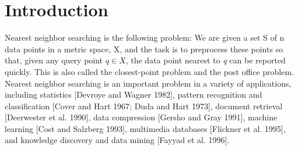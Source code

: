 \documentclass[ijoc,nonblindrev]{informs3} %
\begin{document}
%

\section{Introduction}
Nearest neighbor searching is the following problem: 
We are given a set S of n data points in a metric space, X,
and the task is to preprocess these points so that,
given any query point $q \in X$,
the data point nearest to \textit{q} can be reported quickly.
This is also called the closest-point problem and the post office problem.
Nearest neighbor searching is an important problem in a variety of applications, including 
statistics [Devroye and Wagner 1982],
pattern recognition and classification [Cover and Hart 1967; Duda and Hart 1973],
document retrieval [Deerwester et al. 1990],
data compression [Gersho and Gray 1991],
machine learning [Cost and Salzberg 1993],
multimedia databases [Flickner et al. 1995],
and knowledge discovery and data mining [Fayyad et al. 1996].
\end{document}
